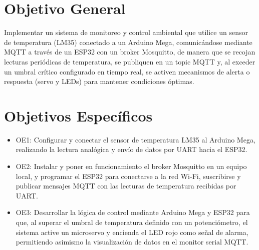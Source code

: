 \section{Objetivo General}

Implementar un sistema de monitoreo y control ambiental que utilice un sensor de temperatura (LM35) conectado a un Arduino Mega, comunicándose mediante MQTT a través de un ESP32 con un broker Mosquitto, de manera que se recojan lecturas periódicas de temperatura, se publiquen en un topic MQTT y, al exceder un umbral crítico configurado en tiempo real, se activen mecanismos de alerta o respuesta (servo y LEDs) para mantener condiciones óptimas.

\section{Objetivos Específicos}

\begin{itemize}
    \item OE1: Configurar y conectar el sensor de temperatura LM35 al Arduino Mega, realizando la lectura analógica y envío de datos por UART hacia el ESP32.
    \item OE2: Instalar y poner en funcionamiento el broker Mosquitto en un equipo local, y programar el ESP32 para conectarse a la red Wi-Fi, suscribirse y publicar mensajes MQTT con las lecturas de temperatura recibidas por UART.
    \item OE3: Desarrollar la lógica de control mediante Arduino Mega y ESP32 para que, al superar el umbral de temperatura definido con un potenciómetro, el sistema active un microservo y encienda el LED rojo como señal de alarma, permitiendo asimismo la visualización de datos en el monitor serial MQTT.
\end{itemize}


